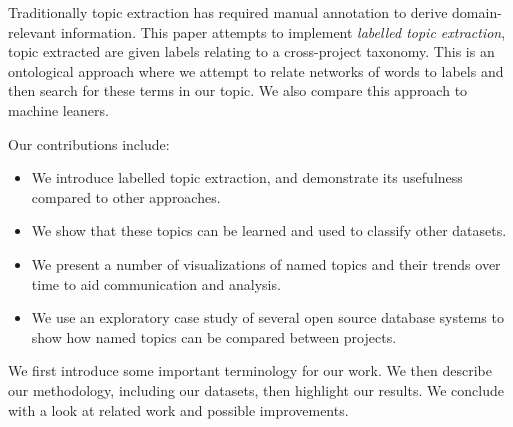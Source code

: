 \documentclass[10pt, conference, compsocconf]{IEEEtran}
\begin{document}

Traditionally topic extraction has required manual annotation to derive domain-relevant information. This paper attempts to implement \emph{labelled topic extraction}, topic extracted are given labels relating to a cross-project taxonomy. This is an ontological approach where we attempt to relate networks of words to labels and then search for these terms in our topic. We also compare this approach to machine leaners.

\begin{comment}
Typically what is distinct is the software's particular functionality -- whether it offers email composition, prepares tax returns, and so on. What is common, however, is the non-functional, or quality requirements, that the software focuses on. Our approach makes use of software quality taxonomies in order to compare different projects on similar concepts. For example, how is the Security quality treated over time by product A versus product B? Does product A care about it more as it matures? Does the quality occur more often in software commits?
\end{comment}

Our contributions include:
\begin{itemize}
\item  We introduce labelled topic extraction, and demonstrate its usefulness
  compared to other approaches.
\item We show that these topics can be learned and used to classify other datasets.
\item We present a number of visualizations of named topics and their trends over time to aid
  communication and analysis.
\item We use an exploratory case study of
  several open source database systems to show how named topics can be compared between projects.
\end{itemize}

We first introduce some important terminology for our work. We then describe our methodology, including our datasets, then highlight our results. We conclude with a look at related work and possible improvements.
\end{document}
